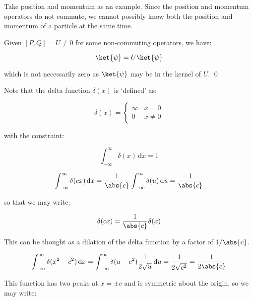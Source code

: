 \documentclass[12pt]{article}
\begin{document}
Take position and momentum as an example. Since the position and momentum operators do not commute, we cannot possibly know both the position and momentum of a particle at the same time.

Given $[P, Q] = U \ne 0$ for some non-commuting operators, we have:

\begin{equation}
    [P, Q] \ket{\psi} = U \ket{\psi}
\end{equation}

which is not necessarily zero as $\ket{\psi}$ may be in the kernel of $U$.
\qed


Note that the delta function $\delta(x)$ is `defined' as:

\begin{equation}
    \delta(x) = \begin{cases}
        \infty & x = 0   \\
        0      & x \ne 0
    \end{cases}
\end{equation}

with the constraint:

\begin{equation}
    \int_{-\infty}^{\infty} \delta(x) \, \mathrm{d}x = 1
\end{equation}


\begin{equation}
    \int_{-\infty}^{\infty} \delta(cx) \, \mathrm{d}x = \frac{1}{\abs{c}} \int_{-\infty}^{\infty} \delta(u) \, \mathrm{d}u = \frac{1}{\abs{c}}
\end{equation}

so that we may write:

\begin{equation}
    \delta(cx) = \frac{1}{\abs{c}} \delta(x)
\end{equation}

This can be thought as a dilation of the delta function by a factor of $1/\abs{c}$.


\begin{equation}
    \int_{-\infty}^{\infty} \delta(x^{2} - c^{2}) \, \mathrm{d}x = \int_{-\infty}^{\infty} \delta(u - c^{2}) \frac{1}{2\sqrt{u}} \, \mathrm{d}u = \frac{1}{2\sqrt{c^{2}}} = \frac{1}{2\abs{c}}
\end{equation}

This function has two peaks at $x = \pm c$ and is symmetric about the origin, so we may write:
\end{document}
